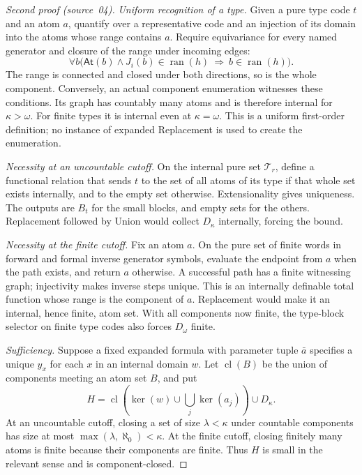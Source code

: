 \documentclass[11pt,letterpaper]{article}
\numberwithin{equation}{section}
\theoremstyle{plain}
\theoremstyle{definition}
\theoremstyle{remark}
\newcommand{\At}{\mathsf{At}}
\newcommand{\kerat}{\operatorname{ker}}
\begin{document}
\begin{proof}[Second proof (source~04)]
\emph{Uniform recognition of a type.}
Given a pure type code $t$ and an atom $a$, quantify
over a representative code and an injection of its domain
into the atoms whose range contains $a$. Require
equivariance for every named generator and closure of the
range under incoming edges:
\[
\forall b\bigl(\At(b)\land J_i(b)\in\operatorname{ran}(h)
  \ \Longrightarrow\ b\in\operatorname{ran}(h)\bigr).
\]
The range is connected and closed under both directions,
so is the whole component. Conversely, an actual component
enumeration witnesses these conditions.
Its graph has countably many atoms and is therefore
internal for $\kappa>\omega$. For finite types it is
internal even at $\kappa=\omega$. This is a uniform
first-order definition; no instance of expanded
Replacement is used to create the enumeration.

\emph{Necessity at an uncountable cutoff.}
On the internal pure set $\mathcal T_r$, define a functional
relation that sends $t$ to the set of all atoms of its
type if that whole set exists internally, and to the
empty set otherwise. Extensionality gives uniqueness.
The outputs are $B_t$ for the small blocks, and
empty sets for the others. Replacement followed by Union
would collect $D_\kappa$ internally, forcing the bound.

\emph{Necessity at the finite cutoff.}
Fix an atom $a$. On the pure set of finite words in
forward and formal inverse generator symbols, evaluate
the endpoint from $a$ when the path exists, and return
$a$ otherwise. A successful path has a finite
witnessing graph; injectivity makes inverse steps unique.
This is an internally definable total function whose
range is the component of $a$. Replacement would make
it an internal, hence finite, atom set. With all components
now finite, the type-block selector on finite type codes
also forces $D_\omega$ finite.

\emph{Sufficiency.}
Suppose a fixed expanded formula with parameter tuple
$\bar a$ specifies a unique $y_x$ for each $x$ in
an internal domain $w$. Let $\operatorname{cl}(B)$
be the union of components meeting an atom set $B$, and put
\[
H=\operatorname{cl}\!\left(
\kerat(w)\cup\bigcup_j\kerat(a_j)\right)\cup D_\kappa.
\]
At an uncountable cutoff, closing a set of size
$\lambda<\kappa$ under countable components has size at
most $\max(\lambda,\aleph_0)<\kappa$.
At the finite cutoff, closing finitely many atoms is
finite because their components are finite. Thus $H$
is small in the relevant sense and is component-closed.


\end{proof}
\end{document}
